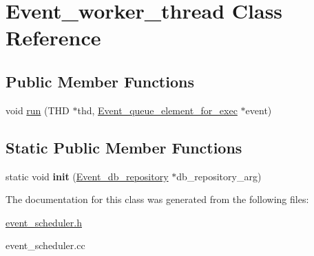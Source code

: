 \hypertarget{classEvent__worker__thread}{}\section{Event\+\_\+worker\+\_\+thread Class Reference}
\label{classEvent__worker__thread}
\subsection*{Public Member Functions}
\begin{DoxyCompactItemize}
\item 
void \mbox{\hyperlink{group__Event__Scheduler_ga3226ac4e79d64e27ce9eebed2234d2c1}{run}} (T\+HD $\ast$thd, \mbox{\hyperlink{classEvent__queue__element__for__exec}{Event\+\_\+queue\+\_\+element\+\_\+for\+\_\+exec}} $\ast$event)
\end{DoxyCompactItemize}
\subsection*{Static Public Member Functions}
\begin{DoxyCompactItemize}
\item 
\mbox{\label{classEvent__worker__thread_a5fa20c29a8507dbaec51e0e6218a915e}} 
static void {\bfseries init} (\mbox{\hyperlink{classEvent__db__repository}{Event\+\_\+db\+\_\+repository}} $\ast$db\+\_\+repository\+\_\+arg)
\end{DoxyCompactItemize}


The documentation for this class was generated from the following files\+:\begin{DoxyCompactItemize}
\item 
\mbox{\hyperlink{event__scheduler_8h}{event\+\_\+scheduler.\+h}}\item 
event\+\_\+scheduler.\+cc\end{DoxyCompactItemize}
